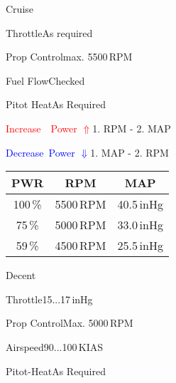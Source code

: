 \begin{checklist}{Cruise}
  \item{Throttle}{As required}
  \item{Prop Control}{max. 5500\,RPM}
  \item{Fuel Flow}{Checked}
  \item{Pitot Heat}{As Required}

  \item{\textcolor{red}{Increase~~Power $\Uparrow$}}{1. RPM - 2. MAP}
  \item{\textcolor{blue}{Decrease~Power $\Downarrow$}}{1. MAP - 2. RPM}
\end{checklist}

\begin{table}[!ht]
  \large
  \centering
  \begin{tabular}{|c|c|c|}
  \hline
  \cellcolor{black!90}\color{white}\textbf{PWR} & \cellcolor{black!90}\color{white}\textbf{RPM}  & \cellcolor{black!90}\color{white}\textbf{MAP} \\ \hline

  100\,\% & 5500\,RPM & 40.5\,inHg \\ \hline
  75\,\% & 5000\,RPM & 33.0\,inHg \\ \hline
  59\,\% & 4500\,RPM & 25.5\,inHg \\ \hline

  \end{tabular}
\end{table}


\begin{checklist}{Decent}
  \item{Throttle}{15...17\,inHg}
  \item{Prop Control}{Max. 5000\,RPM}
  \item{Airspeed}{90...100\,KIAS}
  \item{Pitot-Heat}{As Required}
\end{checklist}


